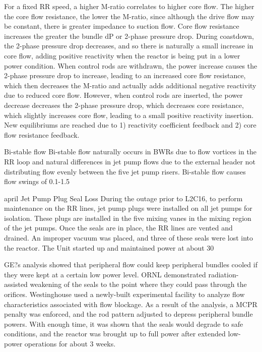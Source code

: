 \documentclass[10pt]{article}
\begin{document}
For a fixed RR speed, a higher M-ratio correlates to higher core flow. The higher the core flow resistance, the lower the M-ratio, since although the drive flow may be constant, there is greater impedance to suction flow. Core flow resistance increases the greater the bundle dP or 2-phase pressure drop. During coastdown, the 2-phase pressure drop decreases, and so there is naturally a small increase in core flow, adding positive reactivity when the reactor is being put in a lower power condition. When control rods are withdrawn, the power increase causes the 2-phase pressure drop to increase, leading to an increased core flow resistance, which then decreases the M-ratio and actually adds additional negative reactivity due to reduced core flow. However, when control rods are inserted, the power decrease decreases the 2-phase pressure drop, which decreases core resistance, which slightly increases core flow, leading to a small positive reactivity insertion. New equilibriums are reached due to 1) reactivity coefficient feedback and 2) core flow resistance feedback.

Bi-stable flow
Bi-stable flow naturally occurs in BWRs due to flow vortices in the RR loop and natural differences in jet pump flows due to the external header not distributing flow evenly between the five jet pump risers. Bi-stable flow causes flow swings of 0.1-1.5%

april Jet Pump Plug Seal Loss
During the outage prior to L2C16, to perform maintenance on the RR lines, jet pump plugs were installed on all jet pumps for isolation. These plugs are installed in the five mixing vanes in the mixing region of the jet pumps. Once the seals are in place, the RR lines are vented and drained. An improper vacuum was placed, and three of these seals were lost into the reactor. The Unit started up and maintained power at about 30%

GE?s analysis showed that peripheral flow could keep peripheral bundles cooled if they were kept at a certain low power level. ORNL demonstrated radiation-assisted weakening of the seals to the point where they could pass through the orifices. Westinghouse used a newly-built experimental facility to analyze flow characteristics associated with flow blockage. As a result of the analysis, a MCPR penalty was enforced, and the rod pattern adjusted to depress peripheral bundle powers. With enough time, it was shown that the seals would degrade to safe conditions, and the reactor was brought up to full power after extended low-power operations for about 3 weeks.
\end{document}
